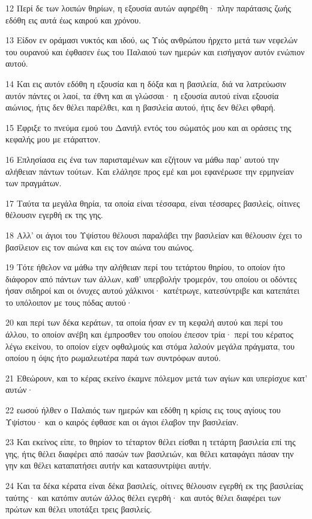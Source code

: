 \par 12 Περί δε των λοιπών θηρίων, η εξουσία αυτών αφηρέθη· πλην παράτασις ζωής εδόθη εις αυτά έως καιρού και χρόνου.
\par 13 Είδον εν οράμασι νυκτός και ιδού, ως Υιός ανθρώπου ήρχετο μετά των νεφελών του ουρανού και έφθασεν έως του Παλαιού των ημερών και εισήγαγον αυτόν ενώπιον αυτού.
\par 14 Και εις αυτόν εδόθη η εξουσία και η δόξα και η βασιλεία, διά να λατρεύωσιν αυτόν πάντες οι λαοί, τα έθνη και αι γλώσσαι· η εξουσία αυτού είναι εξουσία αιώνιος, ήτις δεν θέλει παρέλθει, και η βασιλεία αυτού, ήτις δεν θέλει φθαρή.
\par 15 Έφριξε το πνεύμα εμού του Δανιήλ εντός του σώματός μου και αι οράσεις της κεφαλής μου με ετάραττον.
\par 16 Επλησίασα εις ένα των παρισταμένων και εζήτουν να μάθω παρ' αυτού την αλήθειαν πάντων τούτων. Και ελάλησε προς εμέ και μοι εφανέρωσε την ερμηνείαν των πραγμάτων.
\par 17 Ταύτα τα μεγάλα θηρία, τα οποία είναι τέσσαρα, είναι τέσσαρες βασιλείς, οίτινες θέλουσιν εγερθή εκ της γης.
\par 18 Αλλ' οι άγιοι του Υψίστου θέλουσι παραλάβει την βασιλείαν και θέλουσιν έχει το βασίλειον εις τον αιώνα και εις τον αιώνα του αιώνος.
\par 19 Τότε ήθελον να μάθω την αλήθειαν περί του τετάρτου θηρίου, το οποίον ήτο διάφορον από πάντων των άλλων, καθ' υπερβολήν τρομερόν, του οποίου οι οδόντες ήσαν σιδηροί και οι όνυχες αυτού χάλκινοι· κατέτρωγε, κατεσύντριβε και κατεπάτει το υπόλοιπον με τους πόδας αυτού·
\par 20 και περί των δέκα κεράτων, τα οποία ήσαν εν τη κεφαλή αυτού και περί του άλλου, το οποίον ανέβη και έμπροσθεν του οποίου έπεσον τρία· περί του κέρατος λέγω εκείνου, το οποίον είχεν οφθαλμούς και στόμα λαλούν μεγάλα πράγματα, του οποίου η όψις ήτο ρωμαλεωτέρα παρά των συντρόφων αυτού.
\par 21 Εθεώρουν, και το κέρας εκείνο έκαμνε πόλεμον μετά των αγίων και υπερίσχυε κατ' αυτών·
\par 22 εωσού ήλθεν ο Παλαιός των ημερών και εδόθη η κρίσις εις τους αγίους του Υψίστου· και ο καιρός έφθασε και οι άγιοι έλαβον την βασιλείαν.
\par 23 Και εκείνος είπε, το θηρίον το τέταρτον θέλει είσθαι η τετάρτη βασιλεία επί της γης, ήτις θέλει διαφέρει από πασών των βασιλειών, και θέλει καταφάγει πάσαν την γην και θέλει καταπατήσει αυτήν και κατασυντρίψει αυτήν.
\par 24 Και τα δέκα κέρατα είναι δέκα βασιλείς, οίτινες θέλουσιν εγερθή εκ της βασιλείας ταύτης· και κατόπιν αυτών άλλος θέλει εγερθή· και αυτός θέλει διαφέρει των πρώτων και θέλει υποτάξει τρεις βασιλείς.
